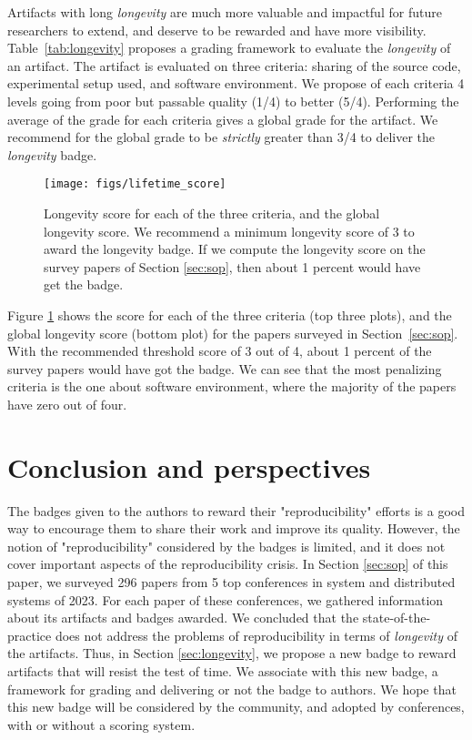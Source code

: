 \documentclass[sigconf,natbib=false]{acmart}
\newcommand{\todo}[1]{{\color{red}{TODO: #1}}}
\begin{document}
Artifacts with long \emph{longevity} are much more valuable and impactful for future researchers to extend, and deserve to be rewarded and have more visibility.
Table\ \ref{tab:longevity} proposes a grading framework to evaluate the \emph{longevity} of an artifact.
The artifact is evaluated on three criteria: sharing of the source code, experimental setup used, and software environment. 
We propose of each criteria 4 levels going from poor but passable quality (1/4) to better (5/4).
Performing the average of the grade for each criteria gives a global grade for the artifact.
We recommend for the global grade to be \emph{strictly} greater than 3/4 to deliver the \emph{longevity} badge.

\begin{figure}
  \centering
    \texttt{[image: figs/lifetime\_score]}
  \caption{Longevity score for each of the three criteria, and the global longevity score. We recommend a minimum longevity score of 3 to award the longevity badge. If we compute the longevity score on the survey papers of Section \ref{sec:sop}, then about 1 percent would have get the badge.}\label{fig:longevity_score}
\end{figure}

Figure \ref{fig:longevity_score} shows the score for each of the three criteria (top three plots), and the global longevity score (bottom plot) for the papers surveyed in Section\ \ref{sec:sop}.
With the recommended threshold score of 3 out of 4, about 1 percent of the survey papers would have got the badge.
We can see that the most penalizing criteria is the one about software environment, where the majority of the papers have zero out of four.

\todo{more discussion on the purpose of badges: rewarding effort, but it could also take a decision in the accept/reject process}



\section{Conclusion and perspectives}\label{sec:conclu}

The badges given to the authors to reward their "reproducibility" efforts is a good way to encourage them to share their work and improve its quality.
However, the notion of "reproducibility" considered by the badges is limited, and it does not cover important aspects of the reproducibility crisis.
In Section \ref{sec:sop} of this paper, we surveyed 296 papers from 5 top conferences in system and distributed systems of 2023.
For each paper of these conferences, we gathered information about its artifacts and badges awarded.
We concluded that the state-of-the-practice does not address the problems of reproducibility in terms of \emph{longevity} of the artifacts.
Thus, in Section \ref{sec:longevity}, we propose a new badge to reward artifacts that will resist the test of time.
We associate with this new badge, a framework for grading and delivering or not the badge to authors.
We hope that this new badge will be considered by the community, and adopted by conferences, with or without a scoring system.
\end{document}
